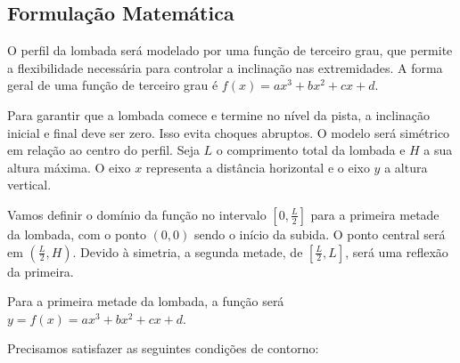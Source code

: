 \documentclass[../resumo.tex]{subfiles}
\begin{document}
	\subsection{Formulação Matemática}

	O perfil da lombada será modelado por uma função de terceiro grau, que permite a flexibilidade
	necessária para controlar a inclinação nas extremidades. A forma geral de uma função de terceiro
	grau é $f(x)= ax^3+ bx^2 + cx + d$.

	Para garantir que a lombada comece e termine no nível da pista, a inclinação inicial e final deve
	ser zero. Isso evita choques abruptos. O modelo será simétrico em relação ao centro do perfil.
	Seja $L$ o comprimento total da lombada e $H$ a sua altura máxima. O eixo $x$ representa a distância
	horizontal e o eixo $y$ a altura vertical.

	Vamos definir o domínio da função no intervalo $[0,\frac{L}{2}]$ para a primeira metade da lombada, com
	o ponto $(0,0)$ sendo o início da subida. O ponto central será em $(\frac{L}{2},H)$. Devido à simetria,
	a segunda metade, de $[\frac{L}{2},L]$, será uma reflexão da primeira.

	Para a primeira metade da lombada, a função será $y=f(x)= ax^3 + bx^2 + cx + d$.

	Precisamos satisfazer as seguintes condições de contorno:
\end{document}
